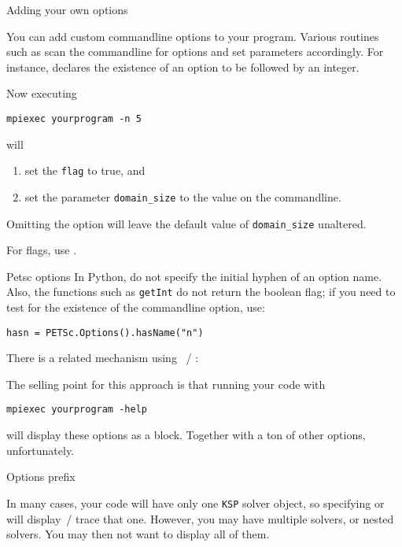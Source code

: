  {Adding your own options}

You can add custom 
commandline options to your program.
Various routines such as 
scan the commandline for options and set parameters accordingly.
For instance,
%
%
declares the existence of an option  to be followed by an integer.

Now executing
\begin{verbatim}
mpiexec yourprogram -n 5
\end{verbatim}
will
\begin{enumerate}
\item set the \lstinline{flag} to true, and
\item set the parameter \lstinline{domain_size} to the value on the commandline.
\end{enumerate}
Omitting the  option will leave the default value of \lstinline{domain_size}
unaltered.

For flags, use .

\begin{pythonnote}{Petsc options}
  In Python, do not specify the initial hyphen of an option name.
  Also, the functions such as \lstinline{getInt} do not return the boolean flag;
  if you need to test for the existence of the commandline option, use:
\begin{verbatim}
hasn = PETSc.Options().hasName("n")
\end{verbatim}
\end{pythonnote}

There is a related mechanism using
~/ :

The selling point for this approach is that running your code with
\begin{verbatim}
mpiexec yourprogram -help
\end{verbatim}
will display these options as a block.
Together with a ton of other options, unfortunately.

 {Options prefix}

In many cases, your code will have only one \lstinline{KSP} solver object,
so specifying  or 
will display~/ trace that one.
However, you may have multiple solvers, or nested solvers. You may then
not want to display all of them.


